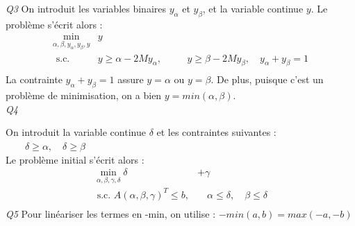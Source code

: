 \documentclass[a4paper,12pt]{article}
\begin{document}
    \textit{Q3 }
    On introduit les variables binaires $y_\alpha$ et $y_\beta$, et la variable continue $y$.
    Le problème s'écrit alors :
    \begin{equation}
        \begin{alignedat}{2}
            \min _{\alpha, \beta, y_\alpha, y_\beta, y} & y \\
            \text{ s.c. } 
            &y \geq \alpha - 2M y_\alpha, & \quad& y \geq \beta - 2M y_\beta, \quad y_\alpha + y_\beta = 1 \\
        \end{alignedat}
    \end{equation}
    La contrainte $y_\alpha + y_\beta = 1$ assure  $y = \alpha$ ou $y = \beta$.
    De plus, puisque c'est un problème de minimisation, on a bien $y = min(\alpha, \beta)$. \\
    \textit{Q4 }

    On introduit la variable continue $\delta$ et les contraintes suivantes :$\qquad \delta \geq \alpha, \quad \delta \geq \beta $ \\
    Le problème initial s'écrit alors :
    \begin{equation}
        \begin{aligned}
            \min _{\alpha, \beta, \gamma, \delta}  \delta &+ \gamma \\
            \text{ s.c. }  A(\alpha, \beta, \gamma)^T \leq b, & \quad \alpha \leq \delta,  \quad \beta \leq \delta \\
        \end{aligned}
    \end{equation}
    \textit{Q5 }
    Pour linéariser les termes en -min, on utilise  : $-min(a,b) = max(-a,-b)$ \\
\end{document}
